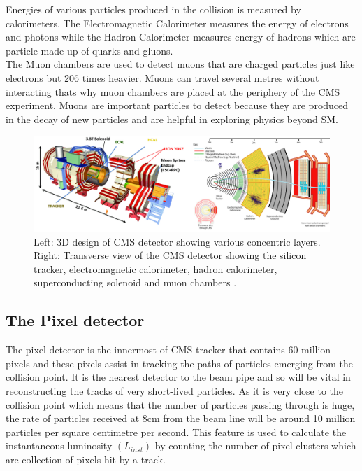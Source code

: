 Energies of various particles produced in the collision is measured by calorimeters. The Electromagnetic Calorimeter measures the energy of electrons and photons while the Hadron Calorimeter measures energy of hadrons which are particle made up of quarks and gluons. \\

The Muon chambers are used to detect muons that are charged particles just like electrons but 206 times heavier. Muons can travel several metres without interacting thats why muon chambers are placed at the periphery of the CMS experiment. Muons are important particles to detect because they are produced in the decay of new particles and are helpful in exploring physics beyond SM.



\begin{figure}[H]
  \centering
  \includegraphics[width=1\columnwidth]{./cmsdetector_merged.png}
  \caption{ \onehalfspacing Left: 3D design of CMS detector showing various concentric layers. Right: Transverse view of the CMS detector showing the silicon tracker, electromagnetic calorimeter, hadron calorimeter, superconducting solenoid and muon chambers \cite{Chatrchyan:2008aa}.}
  \label{fig:CMSdetector}
\end{figure}



\subsection{The Pixel detector}

The pixel detector is the innermost of CMS tracker that contains 60 million pixels and these pixels assist in tracking the paths of particles emerging from the collision point. It is the nearest detector to the beam pipe and so will be vital in reconstructing the tracks of very short-lived particles. As it is very close to the collision point which means that the number of particles passing through is huge, the rate of particles received at 8cm from the beam line will be around 10 million particles per square centimetre per second. This feature is used to calculate the instantaneous luminosity $(L_{inst})$ by counting the number of pixel clusters which are collection of pixels hit by a track.  \\

